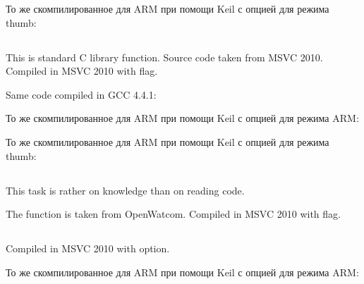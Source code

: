 То же скомпилированное для ARM при помощи Keil с опцией \Othree для режима thumb:



\subsection{}

{This is standard C library function. Source code taken from MSVC 2010. Compiled in MSVC 2010 with \Ox flag.}



{Same code compiled in GCC 4.4.1}:



То же скомпилированное для ARM при помощи Keil с опцией \Othree для режима ARM:



То же скомпилированное для ARM при помощи Keil с опцией \Othree для режима thumb:



\subsection{}

{This task is rather on knowledge than on reading code.}

{The function is taken from OpenWatcom. Compiled in MSVC 2010 with \Ox flag.}



\subsection{}

{Compiled in MSVC 2010 with \Ox option.}



То же скомпилированное для ARM при помощи Keil с опцией \Othree для режима ARM:




